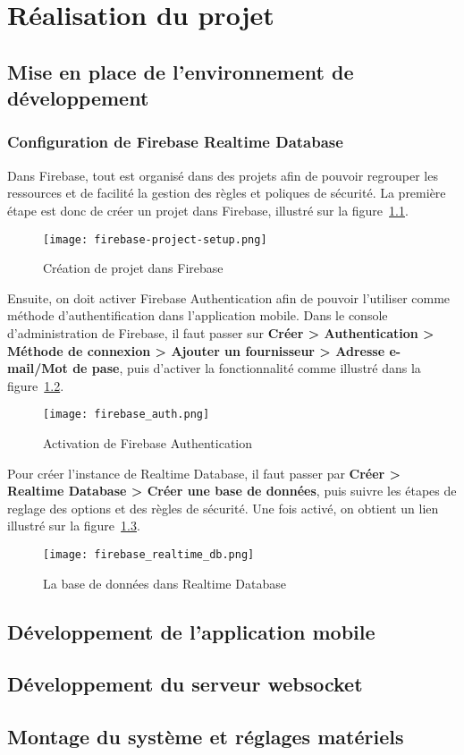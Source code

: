 \pagestyle{fancy}
\fancyhead{} %

\chapter{Réalisation du projet}
\section{Mise en place de l'environnement de développement}
\subsection{Configuration de Firebase Realtime Database}
Dans Firebase, tout est organisé dans des projets afin de pouvoir regrouper les ressources et de facilité la gestion des règles et poliques de sécurité. La première étape est donc de créer un projet dans Firebase, illustré sur la figure~\ref{fig:creation_projet_dans_firebase}.


\begin{figure}[H]
   \centering
   \texttt{[image: firebase-project-setup.png]}
   \caption{Création de projet dans Firebase}
   \label{fig:creation_projet_dans_firebase}
\end{figure}

Ensuite, on doit activer Firebase Authentication afin de pouvoir l'utiliser comme méthode d'authentification dans l'application mobile. Dans le console d'administration de Firebase, il faut passer sur \textbf{Créer > Authentication > Méthode de connexion > Ajouter un fournisseur > Adresse e-mail/Mot de pase}, puis d'activer la fonctionnalité comme illustré dans la figure~\ref{fig:activation_de_Firebase_Auth}.

\begin{figure}[H]
   \centering
   \texttt{[image: firebase\_auth.png]}
   \caption{Activation de Firebase Authentication}
   \label{fig:activation_de_Firebase_Auth}
\end{figure}

Pour créer l'instance de Realtime Database, il faut passer par \textbf{Créer > Realtime Database > Créer une base de données}, puis suivre les étapes de reglage des options et des règles de sécurité. Une fois activé, on obtient un lien illustré sur la  figure~\ref{fig:db_dans_realtime_db}.

\begin{figure}[H]
   \centering
   \texttt{[image: firebase\_realtime\_db.png]}
   \caption{La base de données dans Realtime Database}
   \label{fig:db_dans_realtime_db}
\end{figure}

\section{Développement de l'application mobile}
\section{Développement du serveur websocket}
\section{Montage du système et réglages matériels}
